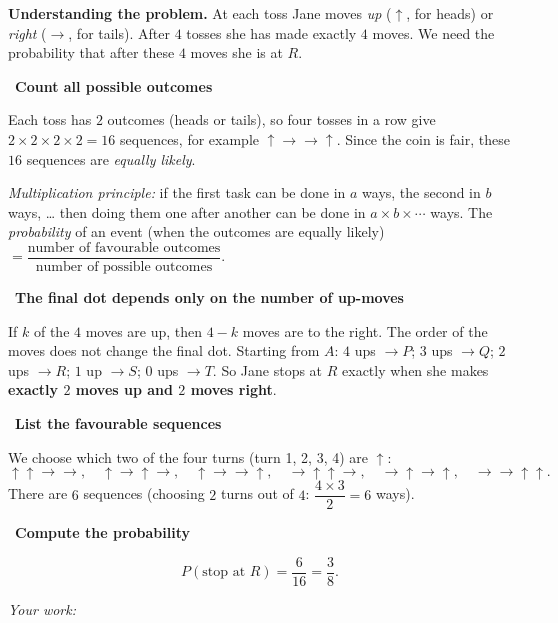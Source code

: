 \documentclass[11pt]{article}
\newif\ifsol \solfalse
\newcommand{\StuProb}[2]{\begin{probboxS}{#1}{#2}\StuProbBody\end{probboxS}}
\newcommand{\probsol}[1]{%
  \begin{lrbox}{\solmeasure}\begin{minipage}{\dimexpr\linewidth-24pt\relax}#1\end{minipage}\end{lrbox}%
  \ifsol
    \begin{solbox}#1\end{solbox}%
  \else
    \setlength{\solht}{\dimexpr\ht\solmeasure+\dp\solmeasure+0.85cm\relax}%
    \ifdim\solht<1.35cm\setlength{\solht}{1.35cm}\fi
    \ifdim\solht>\StudentMaxWork\setlength{\solht}{\StudentMaxWork}\fi
    \par\noindent\begin{minipage}{\linewidth}%
    \expandafter\StuProb\StuProbArgs
    \begin{tcolorbox}[colback=white,colframe=Line,boxrule=0.8pt,arc=5pt,
      left=8pt,right=8pt,top=4pt,bottom=4pt,height=\solht]{\footnotesize\color{Slate}\itshape\WorkWord}\end{tcolorbox}%
    \end{minipage}\par\medskip
  \fi}
\newlength{\StudentMaxWork}\setlength{\StudentMaxWork}{4.5cm}
\newcommand{\step}[2]{\par\smallskip\noindent{\bfseries\color{tmBlue!85!black}\StepWord~#1.}\ {\bfseries #2}\par\nopagebreak}
\def\WorkWord{Your work:}
\def\StepWord{Step}
\begin{document}
\probsol{
\textbf{Understanding the problem.} At each toss Jane moves \emph{up} ($\uparrow$, for heads) or \emph{right}
($\rightarrow$, for tails). After $4$ tosses she has made exactly $4$ moves. We need the probability that after these
$4$ moves she is at $R$.

\step{1}{Count all possible outcomes}
Each toss has $2$ outcomes (heads or tails), so four tosses in a row give
$2\times2\times2\times2=16$ sequences, for example $\uparrow\rightarrow\rightarrow\uparrow$.
Since the coin is fair, these $16$ sequences are \emph{equally likely}.
\begin{recallbox}\emph{Multiplication principle:} if the first task can be done in $a$ ways, the second in $b$ ways, \dots{} then
doing them one after another can be done in $a\times b\times\cdots$ ways. The \emph{probability} of an event (when the outcomes
are equally likely) $=\dfrac{\text{number of favourable outcomes}}{\text{number of possible outcomes}}$.\end{recallbox}

\step{2}{The final dot depends only on the number of up-moves}
If $k$ of the $4$ moves are up, then $4-k$ moves are to the right. The order of the moves does not change the final dot.
Starting from $A$: $4$ ups $\to P$; $3$ ups $\to Q$; $2$ ups $\to R$; $1$ up $\to S$; $0$ ups $\to T$.
So Jane stops at $R$ exactly when she makes \textbf{exactly $2$ moves up and $2$ moves right}.

\step{3}{List the favourable sequences}
We choose which two of the four turns (turn 1, 2, 3, 4) are $\uparrow$:
\[\uparrow\uparrow\rightarrow\rightarrow,\quad \uparrow\rightarrow\uparrow\rightarrow,\quad
\uparrow\rightarrow\rightarrow\uparrow,\quad \rightarrow\uparrow\uparrow\rightarrow,\quad
\rightarrow\uparrow\rightarrow\uparrow,\quad \rightarrow\rightarrow\uparrow\uparrow.\]
There are $6$ sequences (choosing $2$ turns out of $4$: $\dfrac{4\times3}{2}=6$ ways).

\step{4}{Compute the probability}
\[P(\text{stop at } R)=\frac{6}{16}=\frac38.\]

}
\end{document}
